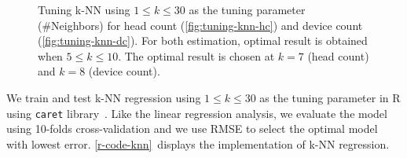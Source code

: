 	\begin{figure}[H]
		\begin{adjustwidth}{-1cm}{}
		\centering
		\end{adjustwidth}
		\caption{Tuning \ac{k-NN} using $1 \le k \le 30$ as the tuning parameter (\#Neighbors) for head count (\ref{fig:tuning-knn-hc}) and device count (\ref{fig:tuning-knn-dc}). For both estimation, optimal result is obtained when $5 \le k \le 10$. The optimal result is chosen at $k=7$ (head count) and $k=8$ (device count).}
		\label{fig:tuning-knn}
	\end{figure}

	We train and test \ac{k-NN} regression using $1 \le k \le 30$ as the tuning parameter in R using \verb|caret| library~\cite{caret}. Like the linear regression analysis, we evaluate the model using 10-folds cross-validation and we use \ac{RMSE} to select the optimal model with lowest error. \autoref{r-code-knn}~displays the implementation of \ac{k-NN} regression.

